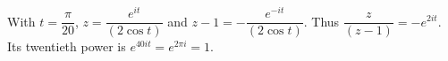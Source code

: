 With $t=\dfrac{\pi}{20}$, $z=\dfrac{e^{it}}{(2\cos t)}$ and $z-1=-\dfrac{e^{-it}}{(2\cos t)}$. Thus $\dfrac{z}{(z-1)}=-e^{2it}$. Its twentieth power is $e^{40it}=e^{2\pi i}=\boxed1$.
